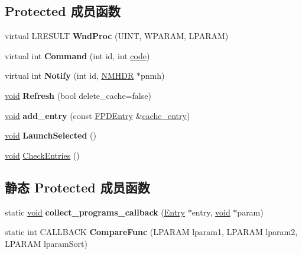 \subsection*{Protected 成员函数}
\begin{DoxyCompactItemize}
\item 
\mbox{\label{struct_find_program_dlg_a35d8a84e4d70aa3f62fe9cf825b605bd}} 
virtual L\+R\+E\+S\+U\+LT {\bfseries Wnd\+Proc} (U\+I\+NT, W\+P\+A\+R\+AM, L\+P\+A\+R\+AM)
\item 
\mbox{\label{struct_find_program_dlg_ab0d3b26086296bf7d5a34d900ad3a673}} 
virtual int {\bfseries Command} (int id, int \hyperlink{structcode}{code})
\item 
\mbox{\label{struct_find_program_dlg_a3f11607509a8e26e6a91a5df8dba8454}} 
virtual int {\bfseries Notify} (int id, \hyperlink{structtag_n_m_h_d_r}{N\+M\+H\+DR} $\ast$pnmh)
\item 
\mbox{\label{struct_find_program_dlg_af68286b8843cc49177582670f696b5f9}} 
\hyperlink{interfacevoid}{void} {\bfseries Refresh} (bool delete\+\_\+cache=false)
\item 
\mbox{\label{struct_find_program_dlg_ac170cf7ea607b64d351d26b6a3fcd7dd}} 
\hyperlink{interfacevoid}{void} {\bfseries add\+\_\+entry} (const \hyperlink{struct_f_p_d_entry}{F\+P\+D\+Entry} \&\hyperlink{structcache__entry}{cache\+\_\+entry})
\item 
\mbox{\label{struct_find_program_dlg_ac48902ba3eba508ecd70904efc703afd}} 
\hyperlink{interfacevoid}{void} {\bfseries Launch\+Selected} ()
\item 
\hyperlink{interfacevoid}{void} \hyperlink{struct_find_program_dlg_a8e701c215c3eae3295f2b1697f8fb9a8}{Check\+Entries} ()
\end{DoxyCompactItemize}
\subsection*{静态 Protected 成员函数}
\begin{DoxyCompactItemize}
\item 
\mbox{\label{struct_find_program_dlg_a3c7900b5ae55abbb8332ad7242d21ef7}} 
static \hyperlink{interfacevoid}{void} {\bfseries collect\+\_\+programs\+\_\+callback} (\hyperlink{struct_entry}{Entry} $\ast$entry, \hyperlink{interfacevoid}{void} $\ast$param)
\item 
\mbox{\label{struct_find_program_dlg_a6d974d4dfb43507da5ffbaa50ae0627d}} 
static int C\+A\+L\+L\+B\+A\+CK {\bfseries Compare\+Func} (L\+P\+A\+R\+AM lparam1, L\+P\+A\+R\+AM lparam2, L\+P\+A\+R\+AM lparam\+Sort)
\end{DoxyCompactItemize}
